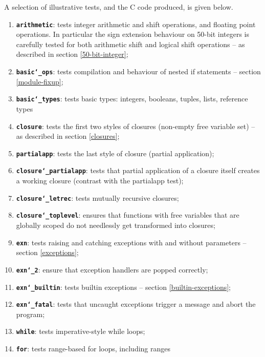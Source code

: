 \documentclass[12pt,a4paper,twoside,openright]{report}
\begin{document}
A selection of illustrative tests, and the C code produced, is given below.

\begin{enumerate}
    \item \textbf{\texttt{arithmetic}}: tests integer arithmetic and shift
        operations, and floating point operations. In particular the sign
        extension behaviour on 50-bit integers is carefully tested for both
        arithmetic shift and logical shift operations -- as described in
        section \ref{50-bit-integer};
    \item \textbf{\texttt{basic\char`_ops}}: tests compilation and behaviour of
        nested if statements -- section \ref{module-fixup};
    \item \textbf{\texttt{basic\char`_types}}: tests basic types: integers,
        booleans, tuples, lists, reference types
    \item \textbf{\texttt{closure}}: tests the first two styles of closures
        (non-empty free variable set) -- as described in section
        \ref{closures};
    \item \textbf{\texttt{partialapp}}: tests the last style of closure
        (partial application);
    \item \textbf{\texttt{closure\char`_partialapp}}: tests that partial
        application of a closure itself creates a working closure (contrast
        with the partialapp test);
    \item \textbf{\texttt{closure\char`_letrec}}: tests mutually recursive
        closures;
    \item \textbf{\texttt{closure\char`_toplevel}}: ensures that functions with
        free variables that are globally scoped do not needlessly get
        transformed into closures;
    \item \textbf{\texttt{exn}}: tests raising and catching exceptions with and
        without parameters -- section \ref{exceptions};
    \item \textbf{\texttt{exn\char`_2}}: ensure that exception handlers are
        popped correctly;
    \item \textbf{\texttt{exn\char`_builtin}}: tests builtin exceptions --
        section \ref{builtin-exceptions};
    \item \textbf{\texttt{exn\char`_fatal}}: tests that uncaught exceptions
        trigger a message and abort the program;
    \item \textbf{\texttt{while}}: tests imperative-style while loops;
    \item \textbf{\texttt{for}}: tests range-based for loops, including ranges

\end{enumerate}
\end{document}

